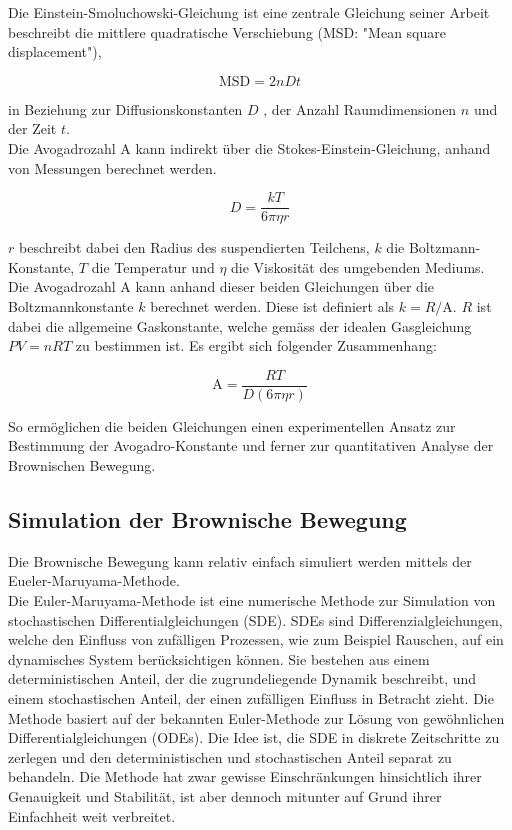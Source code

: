 Die Einstein-Smoluchowski-Gleichung ist eine zentrale Gleichung seiner Arbeit beschreibt die mittlere quadratische Verschiebung (MSD: "Mean square displacement"),

\begin{equation}
	\mathrm{MSD} = 2nDt
\end{equation}

in Beziehung zur Diffusionskonstanten $ D $ , der Anzahl Raumdimensionen $ n $ und der Zeit $ t $.\\


Die Avogadrozahl $ \mathrm{A} $ kann indirekt über die Stokes-Einstein-Gleichung, anhand von Messungen berechnet werden.

\begin{equation}
	D = \frac{kT}{6\pi\eta r}
\end{equation}

$ r $ beschreibt dabei den Radius des suspendierten Teilchens, $ k $ die Boltzmann-Konstante, $ T $ die Temperatur und $ \eta $ die Viskosität des umgebenden Mediums.\\


Die Avogadrozahl $ \mathrm{A} $ kann anhand dieser beiden Gleichungen über die Boltzmannkonstante $ k $ berechnet werden. Diese ist definiert als $ k = R/\mathrm{A} $. $ R $ ist dabei die allgemeine Gaskonstante, welche gemäss der idealen Gasgleichung $ PV = nRT $ zu bestimmen ist. Es ergibt sich folgender Zusammenhang:

\begin{equation}
	\mathrm{A} = \frac{R T}{D (6 \pi \eta r)}
\end{equation}


So ermöglichen die beiden Gleichungen einen experimentellen Ansatz zur Bestimmung der Avogadro-Konstante und ferner zur quantitativen Analyse der Brownischen Bewegung.




\subsection{Simulation der Brownische Bewegung
\label{brown:section:teil0}}

Die Brownische Bewegung kann relativ einfach simuliert werden mittels der Eueler-Maruyama-Methode.\\


Die Euler-Maruyama-Methode ist eine numerische Methode zur Simulation von stochastischen Differentialgleichungen (SDE). SDEs sind Differenzialgleichungen, welche den Einfluss von zufälligen Prozessen, wie zum Beispiel Rauschen, auf ein dynamisches System berücksichtigen können. Sie bestehen aus einem deterministischen Anteil, der die zugrundeliegende Dynamik beschreibt, und einem stochastischen Anteil, der einen zufälligen Einfluss in Betracht zieht. Die Methode basiert auf der bekannten Euler-Methode zur Lösung von gewöhnlichen Differentialgleichungen (ODEs). Die Idee ist, die SDE in diskrete Zeitschritte zu zerlegen und den deterministischen und stochastischen Anteil separat zu behandeln. Die Methode hat zwar gewisse Einschränkungen hinsichtlich ihrer Genauigkeit und Stabilität, ist aber dennoch mitunter auf Grund ihrer Einfachheit weit verbreitet.\\


